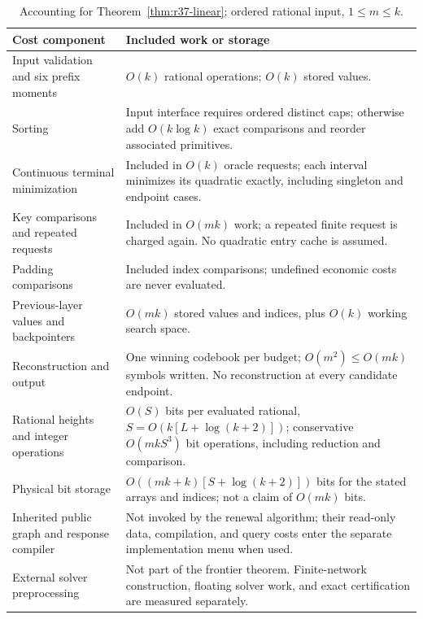 \begin{table}[p]
\caption{Accounting for Theorem~\ref{thm:r37-linear}; ordered rational input, $1\leq m\leq k$.}\label{tab:r37-accounting}
\begin{tabular}{p{}p{}}
\toprule
Cost component & Included work or storage \\
\midrule
Input validation and six prefix moments & $O(k)$ rational operations; $O(k)$ stored values. \\
Sorting & Input interface requires ordered distinct caps; otherwise add $O(k\log k)$ exact comparisons and reorder associated primitives. \\
Continuous terminal minimization & Included in $O(k)$ oracle requests; each interval minimizes its quadratic exactly, including singleton and endpoint cases. \\
Key comparisons and repeated requests & Included in $O(mk)$ work; a repeated finite request is charged again. No quadratic entry cache is assumed. \\
Padding comparisons & Included index comparisons; undefined economic costs are never evaluated. \\
Previous-layer values and backpointers & $O(mk)$ stored values and indices, plus $O(k)$ working search space. \\
Reconstruction and output & One winning codebook per budget; $O(m^2)\leq O(mk)$ symbols written. No reconstruction at every candidate endpoint. \\
Rational heights and integer operations & $O(S)$ bits per evaluated rational, $S=O(k[L+\log(k+2)])$; conservative $O(mkS^3)$ bit operations, including reduction and comparison. \\
Physical bit storage & $O((mk+k)[S+\log(k+2)])$ bits for the stated arrays and indices; not a claim of $O(mk)$ bits. \\
Inherited public graph and response compiler & Not invoked by the renewal algorithm; their read-only data, compilation, and query costs enter the separate implementation menu when used. \\
External solver preprocessing & Not part of the frontier theorem. Finite-network construction, floating solver work, and exact certification are measured separately. \\
\bottomrule
\end{tabular}
\end{table}
